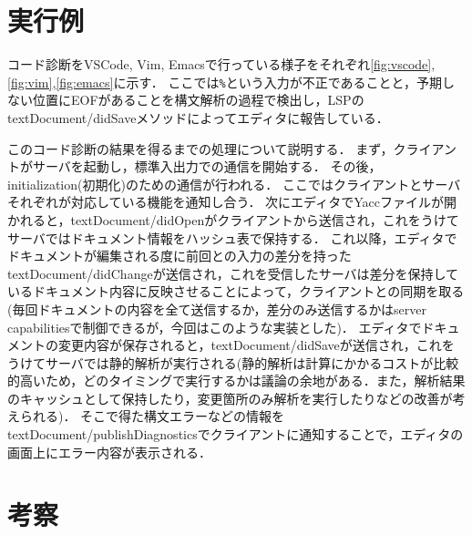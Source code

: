 \documentclass[fontsize=9bp,twocolumn,column_gap=2.36zw,a4paper,report]{jlreq}
\begin{document}
\chapter{実行例}

コード診断をVSCode, Vim, Emacsで行っている様子をそれぞれ\ref{fig:vscode},\ref{fig:vim},\ref{fig:emacs}に示す．
ここでは\texttt{\%}という入力が不正であることと，予期しない位置にEOFがあることを構文解析の過程で検出し，LSPのtextDocument/didSaveメソッドによってエディタに報告している．\par
このコード診断の結果を得るまでの処理について説明する．
まず，クライアントがサーバを起動し，標準入出力での通信を開始する．
その後，initialization(初期化)のための通信が行われる．
ここではクライアントとサーバそれぞれが対応している機能を通知し合う．
次にエディタでYaccファイルが開かれると，textDocument/didOpenがクライアントから送信され，これをうけてサーバではドキュメント情報をハッシュ表で保持する．
これ以降，エディタでドキュメントが編集される度に前回との入力の差分を持ったtextDocument/didChangeが送信され，これを受信したサーバは差分を保持しているドキュメント内容に反映させることによって，クライアントとの同期を取る(毎回ドキュメントの内容を全て送信するか，差分のみ送信するかはserver capabilitiesで制御できるが，今回はこのような実装とした)．
エディタでドキュメントの変更内容が保存されると，textDocument/didSaveが送信され，これをうけてサーバでは静的解析が実行される(静的解析は計算にかかるコストが比較的高いため，どのタイミングで実行するかは議論の余地がある．また，解析結果のキャッシュとして保持したり，変更箇所のみ解析を実行したりなどの改善が考えられる)．
そこで得た構文エラーなどの情報をtextDocument/publishDiagnosticsでクライアントに通知することで，エディタの画面上にエラー内容が表示される．

\begin{figure}[h]
\end{figure}
\begin{figure}[h]
\end{figure}
\begin{figure}[h]
\end{figure}

\chapter{考察}
\end{document}
